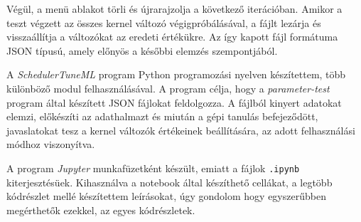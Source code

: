 Végül, a menü ablakot törli és újrarajzolja a következő iterációban.
Amikor a teszt végzett az összes kernel változó végigpróbálásával, a fájlt lezárja és visszaállítja a változókat az eredeti értékükre.
Az így kapott fájl formátuma JSON típusú, amely előnyös a későbbi elemzés szempontjából.


A \textit{SchedulerTuneML} program Python programozási nyelven készítettem, több különböző modul felhasználásával.
A program célja, hogy a \textit{parameter-test} program által készített JSON fájlokat feldolgozza. A fájlból kinyert adatokat elemzi, előkészíti az adathalmazt és miután a gépi tanulás befejeződött, javaslatokat tesz a kernel változók értékeinek beállítására, az adott felhasználási módhoz viszonyítva.


A program \textit{Jupyter} munkafüzetként készült, emiatt a fájlok \texttt{.ipynb} kiterjesztésüek. Kihasználva a notebook által készíthető cellákat, a legtöbb kódrészlet mellé készítettem leírásokat, úgy gondolom hogy egyszerűbben megérthetők ezekkel, az egyes kódrészletek.

